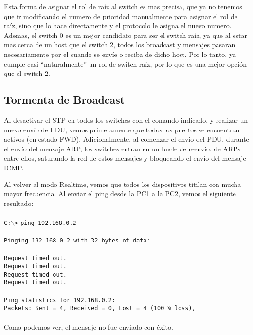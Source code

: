 \documentclass{article}
\begin{document}
Esta forma de asignar el rol de raíz al switch es mas precisa, que ya no tenemos que ir modificando el numero de prioridad manualmente para asignar el rol de raíz, sino que lo hace directamente y el protocolo le asigna el nuevo numero. \\

Ademas, el switch 0 es un mejor candidato para ser el switch raíz, ya que al estar mas cerca de un host que el switch 2, todos los broadcast y mensajes pasaran necesariamente por el cuando se envíe o reciba de dicho host. Por lo tanto, ya cumple casi ``naturalmente'' un rol de switch raíz, por lo que es una mejor opción que el switch 2. \\

\subsection{Tormenta de Broadcast}

Al desactivar el STP en todos los switches con el comando indicado, y realizar un nuevo envío de PDU, vemos primeramente que todos los puertos se encuentran activos (en estado FWD). Adicionalmente, al comenzar el envío del PDU, durante el envío del mensaje ARP, los switches entran en un bucle de reenvío. de ARPs entre ellos, saturando la red de estos mensajes y bloqueando el envío del mensaje ICMP.

Al volver al modo Realtime, vemos que todos los dispositivos titilan con mucha mayor frecuencia. Al enviar el ping desde la PC1 a la PC2, vemos el siguiente resultado: \\\\
\texttt{C:$\backslash$>}
\texttt{ping 192.168.0.2} \\\\
\texttt{Pinging 192.168.0.2 with 32 bytes of data:} \\\\
\texttt{Request timed out.} \\
\texttt{Request timed out.} \\
\texttt{Request timed out.} \\
\texttt{Request timed out.} \\\\
\texttt{Ping statistics for 192.168.0.2:} \\
\texttt{Packets: Sent = 4, Received = 0, Lost = 4 (100 \% loss),} \\\\

Como podemos ver, el mensaje no fue enviado con éxito. \\
\end{document}
